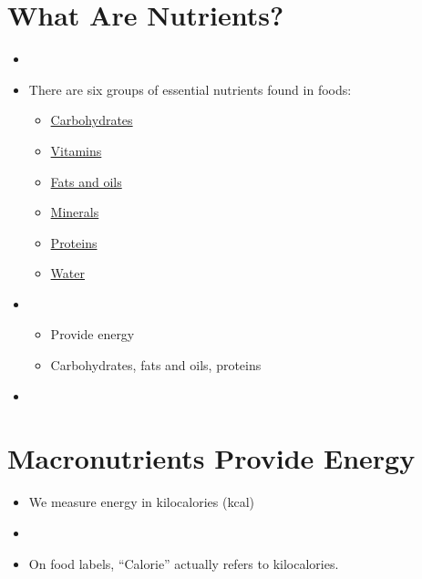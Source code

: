 \documentclass[title={Chapter 1}]{fdsn201notes}
\begin{document}
\section{What Are Nutrients?}\label{sec:what-are-nutrients?}
\begin{itemize}
	\item {}
	\item There are six groups of essential nutrients found in foods:
	\begin{itemize}
		\item \hyperref[subsec:carbohydrates]{Carbohydrates}
		\item \hyperref[subsec:vitamins]{Vitamins}
		\item \hyperref[subsec:fats-and-oils]{Fats and oils}
		\item \hyperref[subsec:minerals]{Minerals}
		\item \hyperref[subsec:proteins]{Proteins}
		\item \hyperref[subsec:water]{Water}
	\end{itemize}
\end{itemize}

\begin{itemize}
	\item {}
	\begin{itemize}
		\item Provide energy
		\item Carbohydrates, fats and oils, proteins
	\end{itemize}
	\item {}
\end{itemize}

\section{Macronutrients Provide Energy}\label{sec:macronutrients-provide-energy}
\begin{itemize}
	\item We measure energy in kilocalories (kcal)\label{dfn:kcal}
	\item {}
	\item On food labels, ``Calorie'' actually refers to kilocalories.
\end{itemize}
\end{document}
